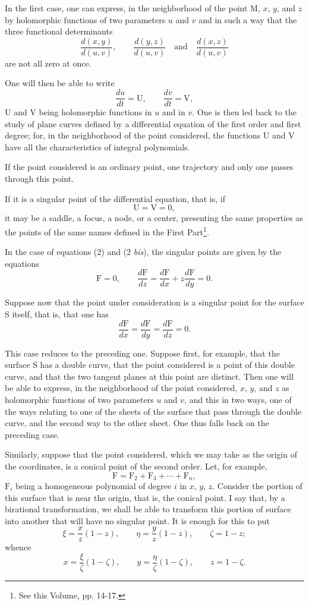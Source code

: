 \documentclass[11pt]{article}
\begin{document}
In the first case, one can express, in the neighborhood of the point M, $x$, $y$, and $z$ by holomorphic functions of two parameters $u$ and $v$ and in such a way that the three functional determinants
\[
\frac{d(x,y)}{d(u,v)},
\qquad
\frac{d(y,z)}{d(u,v)}
\quad\text{and}\quad
\frac{d(x,z)}{d(u,v)}
\]
are not all zero at once.

One will then be able to write
\[
\frac{du}{dt}=\mathrm{U},
\qquad
\frac{dv}{dt}=\mathrm{V},
\]
U and V being holomorphic functions in $u$ and in $v$. One is then led back to the study of plane curves defined by a differential equation of the first order and first degree; for, in the neighborhood of the point considered, the functions U and V have all the characteristics of integral polynomials.

If the point considered is an ordinary point, one trajectory and only one passes through this point.

If it is a singular point of the differential equation, that is, if
\[
\mathrm{U}=\mathrm{V}=0,
\]
it may be a saddle, a focus, a node, or a center, presenting the same properties as the points of the same names defined in the First Part\footnote{See this Volume, pp. 14-17.}.

In the case of equations (2) and (2 \emph{bis}), the singular points are given by the equations
\[
\mathrm{F}=0,
\qquad
\frac{d\mathrm{F}}{dz}=\frac{d\mathrm{F}}{dx}+z\frac{d\mathrm{F}}{dy}=0.
\]

Suppose now that the point under consideration is a singular point for the surface S itself, that is, that one has
\[
\frac{d\mathrm{F}}{dx}=\frac{d\mathrm{F}}{dy}=\frac{d\mathrm{F}}{dz}=0.
\]

This case reduces to the preceding one. Suppose first, for example, that the surface S has a double curve, that the point considered is a point of this double curve, and that the two tangent planes at this point are distinct. Then one will be able to express, in the neighborhood of the point considered, $x$, $y$, and $z$ as holomorphic functions of two parameters $u$ and $v$, and this in two ways, one of the ways relating to one of the sheets of the surface that pass through the double curve, and the second way to the other sheet. One thus falls back on the preceding case.

Similarly, suppose that the point considered, which we may take as the origin of the coordinates, is a conical point of the second order. Let, for example,
\[
\mathrm{F}=\mathrm{F}_2+\mathrm{F}_3+\cdots+\mathrm{F}_n,
\]
$\mathrm{F}_i$ being a homogeneous polynomial of degree $i$ in $x$, $y$, $z$. Consider the portion of this surface that is near the origin, that is, the conical point. I say that, by a birational transformation, we shall be able to transform this portion of surface into another that will have no singular point. It is enough for this to put
\[
\xi=\frac{x}{z}(1-z),
\qquad
\eta=\frac{y}{z}(1-z),
\qquad
\zeta=1-z;
\]
whence
\[
x=\frac{\xi}{\zeta}(1-\zeta),
\qquad
y=\frac{\eta}{\zeta}(1-\zeta),
\qquad
z=1-\zeta.
\]
\end{document}
